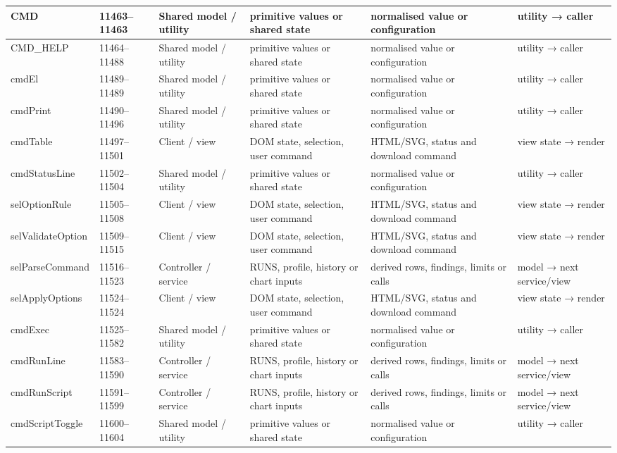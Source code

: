 \begin{landscape}
\begin{longtable}{@{}p{3.2cm}p{1.45cm}p{2.7cm}p{4.0cm}p{4.0cm}p{3.0cm}@{}}
CMD & 11463--11463 & Shared model / utility & primitive values or shared state & normalised value or configuration & utility → caller \\\hline
CMD\_HELP & 11464--11488 & Shared model / utility & primitive values or shared state & normalised value or configuration & utility → caller \\\hline
cmdEl & 11489--11489 & Shared model / utility & primitive values or shared state & normalised value or configuration & utility → caller \\\hline
cmdPrint & 11490--11496 & Shared model / utility & primitive values or shared state & normalised value or configuration & utility → caller \\\hline
cmdTable & 11497--11501 & Client / view & DOM state, selection, user command & HTML/SVG, status and download command & view state → render \\\hline
cmdStatusLine & 11502--11504 & Shared model / utility & primitive values or shared state & normalised value or configuration & utility → caller \\\hline
selOptionRule & 11505--11508 & Client / view & DOM state, selection, user command & HTML/SVG, status and download command & view state → render \\\hline
selValidateOption & 11509--11515 & Client / view & DOM state, selection, user command & HTML/SVG, status and download command & view state → render \\\hline
selParseCommand & 11516--11523 & Controller / service & RUNS, profile, history or chart inputs & derived rows, findings, limits or calls & model → next service/view \\\hline
selApplyOptions & 11524--11524 & Client / view & DOM state, selection, user command & HTML/SVG, status and download command & view state → render \\\hline
cmdExec & 11525--11582 & Shared model / utility & primitive values or shared state & normalised value or configuration & utility → caller \\\hline
cmdRunLine & 11583--11590 & Controller / service & RUNS, profile, history or chart inputs & derived rows, findings, limits or calls & model → next service/view \\\hline
cmdRunScript & 11591--11599 & Controller / service & RUNS, profile, history or chart inputs & derived rows, findings, limits or calls & model → next service/view \\\hline
cmdScriptToggle & 11600--11604 & Shared model / utility & primitive values or shared state & normalised value or configuration & utility → caller \\\hline

\end{longtable}
\end{landscape}
